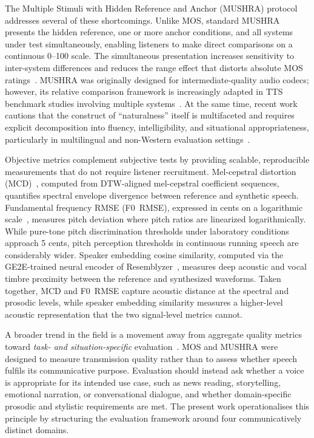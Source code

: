 \documentclass[a4paper,fleqn]{cas-dc}
\begin{document}
    The Multiple Stimuli with Hidden Reference and Anchor (MUSHRA)
    protocol~\citep{itu2015mushra} addresses several of these shortcomings. Unlike MOS, standard MUSHRA presents the hidden reference, one or more anchor conditions, and all systems under test simultaneously, enabling listeners to make direct comparisons on a continuous 0--100 scale. The simultaneous presentation increases sensitivity to inter-system differences and reduces the range effect that distorts absolute MOS ratings~\citep{chiang2024mushraevaluate,varadhan2024mushra}. MUSHRA was originally designed for intermediate-quality audio codecs; however, its relative comparison framework is increasingly adapted in TTS benchmark studies involving multiple systems~\citep{lemaguer2024limits}. At the same time, recent work cautions that the construct of ``naturalness'' itself is multifaceted and requires explicit decomposition into fluency, intelligibility, and situational appropriateness, particularly in multilingual and non-Western evaluation settings~\citep{shirali2023better,pandey2025what}.
    
    Objective metrics complement subjective tests by providing scalable, reproducible measurements that do not require listener recruitment. Mel-cepstral distortion (MCD)~\citep{kubichek1993mcd}, computed from DTW-aligned mel-cepstral coefficient sequences, quantifies spectral envelope divergence between reference and synthetic speech. Fundamental frequency RMSE (F0~RMSE), expressed in cents on a logarithmic scale~\citep{fastl2007psychoacoustics}, measures pitch deviation where pitch ratios are linearized logarithmically. While pure-tone pitch discrimination thresholds under laboratory conditions approach 5 cents, pitch perception thresholds in continuous running speech are considerably wider. Speaker embedding cosine similarity, computed via the GE2E-trained neural encoder of Resemblyzer~\citep{wan2018ge2e}, measures deep acoustic and vocal timbre proximity between the reference and synthesized waveforms. Taken together, MCD and F0~RMSE capture acoustic distance at the spectral and prosodic levels, while speaker
    embedding similarity measures a higher-level acoustic representation that the two
    signal-level metrics cannot.
    
    A broader trend in the field is a movement away from aggregate quality metrics
    toward \emph{task- and situation-specific} evaluation~\citep{bailly2025hot}. MOS and MUSHRA were designed to measure transmission quality rather than to assess whether speech fulfils its communicative purpose. Evaluation should instead ask whether a voice is appropriate for its intended use case, such as news reading, storytelling, emotional narration, or conversational dialogue, and whether domain-specific prosodic and stylistic requirements are met. The present work operationalises this principle by structuring the evaluation framework around four communicatively distinct domains.
    
\end{document}

